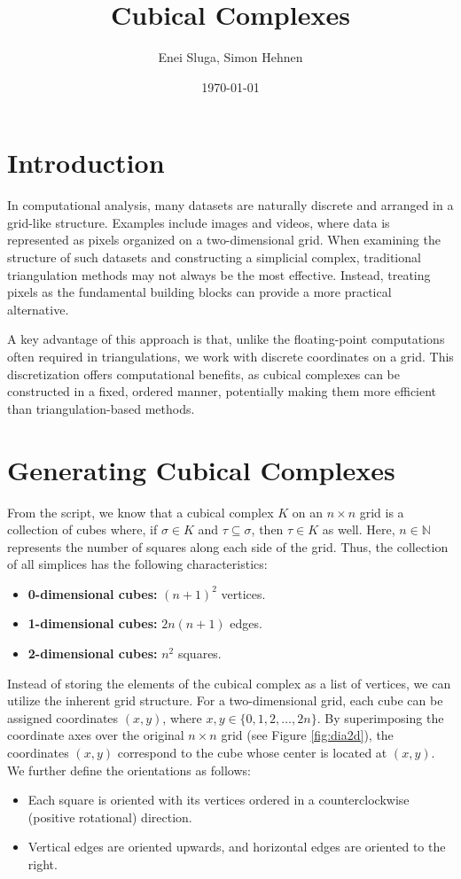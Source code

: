 \documentclass{article}
\title{Cubical Complexes} %
\author{Enei Sluga, Simon Hehnen} %
\affil
{
    Faculty of Computer and Information Science \\
    University of Ljubljana %
}
\date{\today} %
\begin{document}
    \maketitle
    \section{Introduction}\label{sec:intro}
    In computational analysis, many datasets are naturally discrete and arranged in a grid-like structure.
    Examples include images and videos, where data is represented as pixels organized on a two-dimensional grid.
    When examining the structure of such datasets and constructing a simplicial complex,
    traditional triangulation methods may not always be the most effective.
    Instead, treating pixels as the fundamental building blocks can provide a more practical alternative.
    
    A key advantage of this approach is that, unlike the floating-point computations often required in triangulations,
    we work with discrete coordinates on a grid. This discretization offers computational benefits,
    as cubical complexes can be constructed in a fixed, ordered manner, potentially making them more
    efficient than triangulation-based methods.
    
    \section{Generating Cubical Complexes}\label{sec:generation}
    From the script, we know that a cubical complex $K$ on an $n \times n$ grid is a collection of cubes where,
    if $\sigma \in K$ and $\tau \subseteq \sigma$, then $\tau \in K$ as well. Here, $n \in \mathbb{N}$
    represents the number of squares along each side of the grid.
    Thus, the collection of all simplices has the following characteristics:
    \begin{itemize}
        \item \textbf{0-dimensional cubes:} $(n+1)^2$ vertices.
        \item \textbf{1-dimensional cubes:} $2n(n+1)$ edges.
        \item \textbf{2-dimensional cubes:} $n^2$ squares.
    \end{itemize}
    
    Instead of storing the elements of the cubical complex as a list of vertices,
    we can utilize the inherent grid structure. For a two-dimensional grid,
    each cube can be assigned coordinates $(x, y)$, where $x, y \in \{0, 1, 2, \dots, 2n\}$.
    By superimposing the coordinate axes over the original $n \times n$ grid (see Figure \ref{fig:dia2d}),
    the coordinates $(x, y)$ correspond to the cube whose center is located at $(x, y)$.
    We further define the orientations as follows:
    \begin{itemize}
        \item Each square is oriented with its vertices ordered in a counterclockwise (positive rotational) direction.
        \item Vertical edges are oriented upwards, and horizontal edges are oriented to the right.
    \end{itemize}
    
\end{document}
